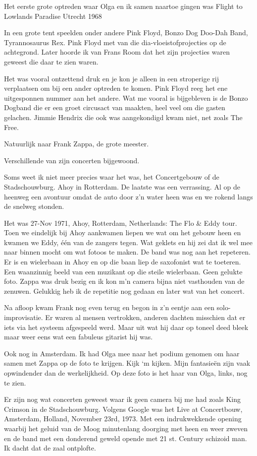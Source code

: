 \documentclass[10pt,twoside,openright]{memoir}
\begin{document}
Het eerste grote optreden waar Olga en ik samen naartoe gingen was 
Flight to Lowlands Paradise Utrecht 1968

In een grote tent speelden onder andere Pink Floyd, Bonzo Dog Doo-Dah Band, Tyrannosaurus Rex. Pink Floyd met van die dia-vloeistofprojecties op de achtegrond. Later hoorde ik van Frans Room dat het zijn projecties waren geweest die daar te zien waren. 

Het was vooral ontzettend druk en je kon je alleen in een stroperige rij verplaatsen om bij een ander optreden te komen. 
Pink Floyd reeg het ene uitgesponnen nummer aan het andere. Wat me vooral is bijgebleven is de Bonzo Dogband die er een groet circusact van maakten, heel veel om die gasten gelachen. Jimmie Hendrix die ook was aangekondigd kwam niet, net zoals The Free.

Natuurlijk naar Frank Zappa, de grote meester. 

Verschillende van zijn concerten bijgewoond.

Soms weet ik niet meer precies waar het was, het Concertgebouw of de Stadschouwburg. Ahoy in Rotterdam. De laatste was een verrassing. Al op de heenweg een avontuur omdat de auto door z’n water heen was en we rokend langs de snelweg stonden. 

Het was 27-Nov 1971, Ahoy, Rotterdam, Netherlands: The Flo & Eddy tour. Toen we eindelijk bij Ahoy aankwamen liepen we wat om het gebouw heen en kwamen we Eddy, één van de zangers tegen. Wat geklets en hij zei dat ik wel mee naar binnen mocht om wat fotoos te maken. De band was nog aan het repeteren. Er is en wielerbaan in Ahoy en op die baan liep de saxofonist wat te toeteren. Een waanzinnig beeld van een muzikant op die steile wielerbaan. Geen gelukte foto. Zappa was druk bezig en ik kon m’n camera bijna niet vasthouden van de zenuwen. Gelukkig heb ik de repetitie nog gedaan en later wat van het concert. 

Na afloop kwam Frank nog even terug en begon in z’n eentje aan een solo-improvisatie. Er waren al mensen vertrokken, anderen dachten misschien dat er iets via het systeem afgespeeld werd. Maar uit wat hij daar op toneel deed bleek maar weer eens wat een fabuleus gitarist hij was.

Ook nog in Amsterdam. Ik had Olga mee naar het podium genomen om haar samen met Zappa op de foto te krijgen. Kijk ‘m kijken. Mijn fantasieën zijn vaak opwindender dan de werkelijkheid. Op deze foto is het haar van Olga, links, nog te zien. 

Er zijn nog wat concerten geweest waar ik geen camera bij me had zoals King Crimson in de Stadschouwburg. Volgens Google was het Live at Concertbouw, Amsterdam, Holland, November 23rd, 1973. Met een indrukwekkende opening waarbij het geluid van de Moog minutenlang doorging met heen en weer zweven en de band met een donderend geweld opende met 21 st. Century schizoid man. Ik dacht dat de zaal ontplofte.
\end{document}

